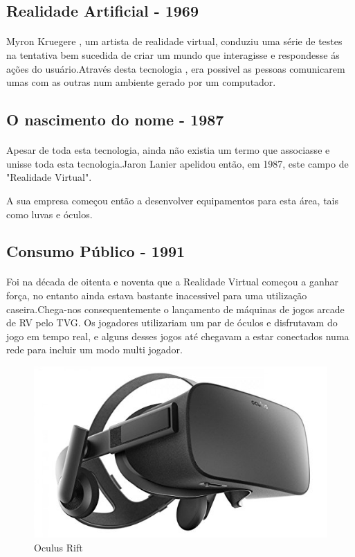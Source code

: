 	\subsection{Realidade Artificial - 1969}
\paragraph{}
Myron Kruegere , um artista de realidade virtual, conduziu uma série de testes na tentativa bem sucedida de criar um mundo que interagisse e respondesse ás ações do usuário.Através desta tecnologia , era possivel as pessoas comunicarem umas com as outras num ambiente gerado por um computador.
	\subsection{O nascimento do nome - 1987}
\paragraph{}
Apesar de toda esta tecnologia, ainda não existia um termo que associasse e unisse toda esta tecnologia.Jaron Lanier apelidou então, em 1987, este campo de "Realidade Virtual".
	
A sua empresa começou então a desenvolver equipamentos para esta área, tais como luvas e óculos.
	\subsection{Consumo Público - 1991}
\paragraph{}
Foi na década de oitenta e noventa que a Realidade Virtual começou a ganhar força, no entanto ainda estava bastante inacessivel para uma utilização caseira.Chega-nos consequentemente o lançamento de máquinas de jogos arcade de RV pelo TVG. Os jogadores utilizariam um par de óculos e disfrutavam do jogo em tempo real, e alguns desses jogos até chegavam a estar conectados numa rede para incluir um modo multi jogador.
\begin{figure}
\center
\includegraphics[scale=0.3]{imagens/OR.jpg}
\caption{Oculus Rift}
\end{figure}
